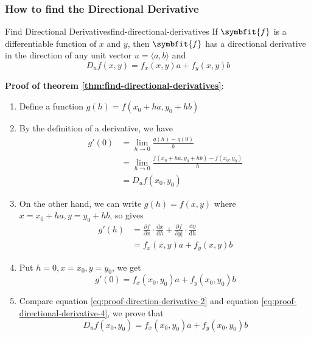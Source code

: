 \documentclass[math,code]{amznotes}
\theoremstyle{remark}
\begin{document}
\subsubsection{How to find the Directional Derivative}
\begin{thmbox}{Find Directional Derivatives}{find-directional-derivatives}
    If $\symbfit{f}$ is a differentiable function of $x$ and $y$, then $\symbfit{f}$ has a directional derivative in the direction of any unit vector $u=\langle a,b \rangle$ and
    \begin{displaymath}
        D_uf(x,y)=f_x(x,y)a+f_y(x,y)b
    \end{displaymath}
\end{thmbox}
\textbf{Proof of theorem \ref{thm:find-directional-derivatives}}: \newline
\begin{enumerate}
    \item Define a function $g(h)=f(x_0+ha, y_0+hb)$
    \item By the definition of a derivative, we have
    \begin{align}
        g'(0)&=\lim\limits_{h \to 0}\frac{g(h)-g(0)}{h} \\
        &=\lim\limits_{h \to 0}\frac{f(x_0+ha, y_0+hb)-f(x_0,y_0)}{h} \\
        &=D_uf(x_0,y_0) \label{eq:proof-direction-derivative-2}
    \end{align}
    \item On the other hand, we can write $g(h)=f(x,y)$ where $x=x_0+ha, y=y_0+hb$, so  gives
    \begin{align*}
        g'(h)&=\frac{\partial f}{\partial x} \cdot \frac{\mathrm d x}{\mathrm d h} + \frac{\partial f}{\partial y]} \cdot \frac{\mathrm d y}{\mathrm d h} \\
        &=f_x(x,y)a+f_y(x,y)b
    \end{align*}
    \item Put $h=0, x=x_0, y=y_0$, we get
    \begin{equation} \label{eq:proof-directional-derivative-4}
        g'(0)=f_x(x_0,y_0)a + f_y(x_0,y_0)b
    \end{equation}
    \item Compare equation \eqref{eq:proof-direction-derivative-2} and equation \eqref{eq:proof-directional-derivative-4}, we prove that
    \begin{equation} \label{eq:directional-derivative-equation}
        D_uf(x_0,y_0)=f_x(x_0,y_0)a+f_y(x_0,y_0)b
    \end{equation}
\end{enumerate}
\end{document}
